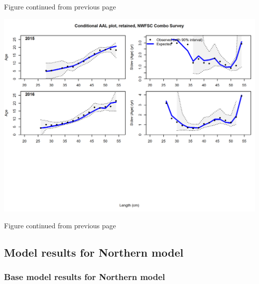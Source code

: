 \documentclass[12pt,]{article}
\begin{document}
\begin{center} 

            Figure continued from previous page 

            \end{center}

\includegraphics{./r4ss/plots_mod1/comp_condAALfit_Andre_plotsflt6mkt2_page5.png}

\begin{center} 

            Figure continued from previous page 

            \end{center}

\FloatBarrier

\newpage

\subsection{Model results for Northern
model}\label{model-results-for-northern-model}

\subsubsection{Base model results for Northern
model}\label{base-model-results-for-northern-model}
\end{document}
